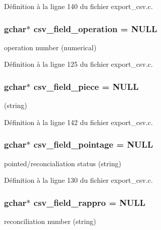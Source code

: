 Définition à la ligne 140 du fichier export\_\-csv.c.

\subsubsection[{csv\_\-field\_\-operation}]{\setlength{\rightskip}{0pt plus 5cm}gchar$\ast$ {\bf csv\_\-field\_\-operation} = NULL}\label{export__csv_8c_aa1e0c649dcb5b49785da5599f266840c}
operation number (numerical) 

Définition à la ligne 125 du fichier export\_\-csv.c.

\subsubsection[{csv\_\-field\_\-piece}]{\setlength{\rightskip}{0pt plus 5cm}gchar$\ast$ {\bf csv\_\-field\_\-piece} = NULL}\label{export__csv_8c_a4ab890fdb2b76c217de90a4ef1839789}
(string) 

Définition à la ligne 142 du fichier export\_\-csv.c.

\subsubsection[{csv\_\-field\_\-pointage}]{\setlength{\rightskip}{0pt plus 5cm}gchar$\ast$ {\bf csv\_\-field\_\-pointage} = NULL}\label{export__csv_8c_a4b66e2d67a46f5633bbec0273936e492}
pointed/reconcialiation status (string) 

Définition à la ligne 130 du fichier export\_\-csv.c.

\subsubsection[{csv\_\-field\_\-rappro}]{\setlength{\rightskip}{0pt plus 5cm}gchar$\ast$ {\bf csv\_\-field\_\-rappro} = NULL}\label{export__csv_8c_ad171896d4460c5848926dd21b7887ec9}
reconciliation number (string) 

